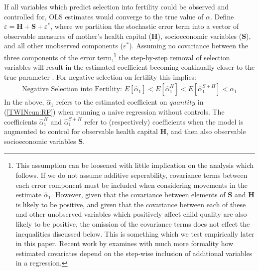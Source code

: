 \documentclass[subeqn]{article}
\begin{document}
\begin{spacing}{1.4}
If all variables which predict selection into fertility could be observed and controlled for, OLS estimates would converge to the true value
of $\alpha$.  Define $\varepsilon=\bm{H}+\bm{S}+\varepsilon^*$, where we partition the
stochastic error term into a vector of observable measures of mother's health
capital ($\bm{H}$), socioeconomic variables ($\bm{S}$), and all other unobserved components
($\varepsilon^*$).  Assuming no covariance between the three components of the
error term,\footnote{This assumption can be loosened with little implication on the
  analysis which follows.  If we do not assume additive seperability, covariance
  terms between each error component must be included when considering movements in
  the estimate $\hat\alpha_1$.  However, given that the covariance between elements
  of $\bm{S}$ and $\bm{H}$ is likely to be positive, and given that the covariance
  between each of these and other unobserved variables which positively affect
  child quality are also likely to be positive, the omission of the covariance
  terms does not effect the inequalities discussed below.  This is something which
  we test empirically later in this paper.  Recent work by \citet{Gelbach2016}
  examines with much more formality how estimated covariates depend on the step-wise
  inclusion of additional variables in a regression.} the step-by-step removal of
selection variables will result in the estimated coefficient becoming continually closer to the true parameter . For negative selection on fertility this implies:
\begin{eqnarray}
  \text{Negative Selection into Fertility:\ \ \ } E[\hat\alpha_1] < E[\hat\alpha_1^{H}] < E[\hat\alpha_1^{S+H}] < \alpha_1 \nonumber 
\end{eqnarray}
In the above, $\hat\alpha_1$ refers to the estimated coefficient on
$quantity$ in (\ref{TWINeqn:RF}) when running a naive regression without
controls.  The coefficients $\hat\alpha_1^H$ and $\hat\alpha_1^{S+H}$
refer to (respectively) coefficients when the model is augmented to
control for observable health capital $\bm{H}$, and then also observable
socioeconomic variables $\bm{S}$.


\end{spacing}
\end{document}
